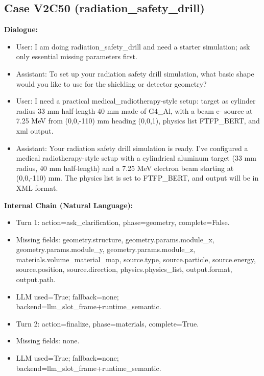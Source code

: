 \documentclass[11pt]{ctexart}
\begin{document}
\subsection{Case V2C50 (radiation\_safety\_drill)}
\textbf{Dialogue:}
\begin{itemize}
\item User: I am doing radiation\_safety\_drill and need a starter simulation; ask only essential missing parameters first.
\item Assistant: To set up your radiation safety drill simulation, what basic shape would you like to use for the shielding or detector geometry?
\item User: I need a practical medical\_radiotherapy-style setup: target as cylinder radius 33 mm half-length 40 mm made of G4\_Al, with a beam e- source at 7.25 MeV from (0,0,-110) mm heading (0,0,1), physics list FTFP\_BERT, and xml output.
\item Assistant: Your radiation safety drill simulation is ready. I've configured a medical radiotherapy-style setup with a cylindrical aluminum target (33 mm radius, 40 mm half-length) and a 7.25 MeV electron beam starting at (0,0,-110) mm. The physics list is set to FTFP\_BERT, and output will be in XML format.
\end{itemize}
\textbf{Internal Chain (Natural Language):}
\begin{itemize}
\item Turn 1: action=ask\_clarification, phase=geometry, complete=False.
\item Missing fields: geometry.structure, geometry.params.module\_x, geometry.params.module\_y, geometry.params.module\_z, materials.volume\_material\_map, source.type, source.particle, source.energy, source.position, source.direction, physics.physics\_list, output.format, output.path.
\item LLM used=True; fallback=none; backend=llm\_slot\_frame+runtime\_semantic.
\item Turn 2: action=finalize, phase=materials, complete=True.
\item Missing fields: none.
\item LLM used=True; fallback=none; backend=llm\_slot\_frame+runtime\_semantic.
\end{itemize}
\end{document}
